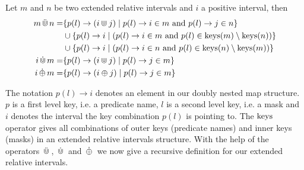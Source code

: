 \begin{definition}
    Let $m$ and $n$ be two extended relative intervals and $i$ a positive interval, then 
    \begin{align*}
        m \,\ddot{\Cup}\, n = 
            & \{ p(l) \rightarrow (i \Cup j) \mid 
                p(l) \rightarrow i \in m \text{ and } 
                p(l) \rightarrow j \in n \} \\
            & \cup \{p(l) \rightarrow i \mid  
                (p(l) \rightarrow i \in m \text{ and }
                p(l) \in \operatorname{keys}(m) \setminus \operatorname{keys}(n)) \} \\
            & \cup \{p(l) \rightarrow i \mid  
                (p(l) \rightarrow i \in n \text{ and }
                p(l) \in \operatorname{keys}(n) \setminus \operatorname{keys}(m))
                \}        
                \\
        i \,\dot{\Cup}\, m = 
            & \{ p(l) \rightarrow (i \Cup j) \mid 
                p(l) \rightarrow j \in m \} \\
        i \,\dot{\oplus}\, m = 
            & \{ p(l) \rightarrow (i \oplus j) \mid 
                p(l) \rightarrow j \in m \} \\
    \end{align*}
\end{definition}

The notation $p(l) \rightarrow i$ denotes an element in our doubly nested map structure.
$p$ is a first level key, i.e. a predicate name, $l$ is a second level key, i.e. a mask and $i$ denotes the interval the key combination $p(l)$ is pointing to.
The $\operatorname{keys}$ operator gives all combinations of outer keys (predicate names) and inner keys (masks) in an extended relative intervals structure.
With the help of the operators $\,\ddot{\Cup}\,$, $\,\dot{\Cup}\,$ and $\,\dot{\oplus}\,$ we now give a recursive definition for our extended relative intervals.

